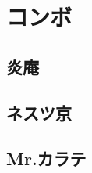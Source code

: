 \documentclass[a4j,11pt]{jarticle}
\begin{document}
\section{コンボ}
\subsection{炎庵}
\subsection{ネスツ京}
\subsection{Mr.カラテ}
\end{document}
